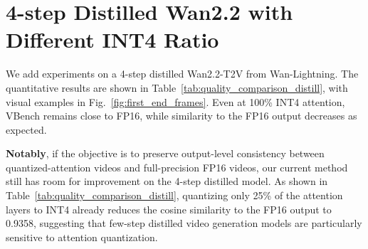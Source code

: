 \documentclass[runningheads]{llncs}
\begin{document}
\section{4-step Distilled Wan2.2 with Different INT4 Ratio}

We add experiments on a 4-step distilled Wan2.2-T2V from Wan-Lightning. The quantitative results are shown in Table~\ref{tab:quality_comparison_distill}, with visual examples in Fig.~\ref{fig:first_end_frames}. Even at 100\% INT4 attention, VBench remains close to FP16, while similarity to the FP16 output decreases as expected.


\textbf{Notably}, if the objective is to preserve output-level consistency between quantized-attention videos and full-precision FP16 videos, our current method still has room for improvement on the 4-step distilled model. As shown in Table~\ref{tab:quality_comparison_distill}, quantizing only 25\% of the attention layers to INT4 already reduces the cosine similarity to the FP16 output to 0.9358, suggesting that few-step distilled video generation models are particularly sensitive to attention quantization.

\begin{table}[h]
  \centering
  \scriptsize
  \vspace{-0.4em}
  \setlength{\tabcolsep}{3.2pt}
  \renewcommand{\arraystretch}{0.92}
  \caption{\small 4-step distilled Wan2.2-T2V with different INT4 ratios.}
  \label{tab:quality_comparison_distill}
  \vspace{-0.8em}
\end{table}
\end{document}

